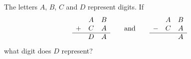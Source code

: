 The letters $A$, $B$, $C$ and $D$ represent digits. If
\[\begin{array}{ccc}&A&B\\+&C&A\\\hline&D&A\end{array}\qquad\text{and}\qquad\begin{array}{ccc}&A&B\\-&C&A\\\hline&&A\end{array}\]
what digit does $D$ represent?
